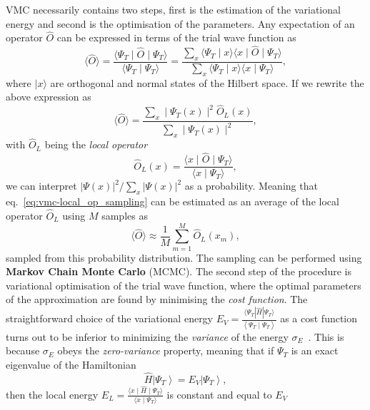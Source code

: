 VMC necessarily contains two steps, first is the estimation of the variational energy and second is the optimisation of the parameters. Any expectation of an operator $\hat{O}$ can be expressed in terms of the trial wave function as
\begin{equation}
	\langle\hat{O}\rangle=\frac{\langle\Psi_{T}\mid\hat{O}\mid \Psi_{T}\rangle}{\langle\Psi_{T} \mid \Psi_{T}\rangle}=\frac{\sum_{x}\langle\Psi_{T} \mid x\rangle\langle x\mid\hat{O}\mid \Psi_{T}\rangle}{\sum_{x}\langle\Psi_{T} \mid x\rangle\langle x \mid \Psi_{T}\rangle},
\end{equation}
where $\mid x \rangle$ are orthogonal and normal states of the Hilbert space. If we rewrite the above expression as 
\begin{equation}
	\label{eq:vmc-local_op_sampling}
	\langle \hat{O} \rangle = \frac{\sum_{x}\mid\Psi_{T}(x)\mid^{2} \hat{O}_{L}(x)}{\sum_{x}\mid\Psi_{T}(x)\mid^{2}},
\end{equation}
with $\hat{O}_L$ being the \emph{local operator}
\begin{equation}
	\hat{O}_{L}(x)=\frac{\langle x\mid\hat{O}\mid \Psi_{T}\rangle}{\langle x \mid \Psi_{T}\rangle}, 
\end{equation}
	we can interpret $|\Psi(x)|^{2}/\sum_{x}|\Psi(x)|^{2}$ as a probability. Meaning that eq.~\eqref{eq:vmc-local_op_sampling} can be estimated as an average of the local operator $\hat{O}_L$ using $M$ samples as
\begin{equation}
	\langle\hat{O}\rangle \approx \frac{1}{M} \sum_{m=1}^{M} \hat{O}_{L}\left(x_{m}\right),
\end{equation}
sampled from this probability distribution. The sampling can be performed using \textbf{Markov Chain Monte Carlo} (MCMC). The second step of the procedure is variational optimisation of the trial wave function, where the optimal parameters of the approximation are found by minimising the \emph{cost function}. The straightforward choice of the variational energy $E_V = \frac{\langle\Psi_{T}|\hat{H}| \Psi_{T}\rangle}{\left\langle\Psi_{T} \mid \Psi_{T}\right\rangle}$ as a cost function turns out to be inferior to minimizing the \emph{variance} of the energy $\sigma_E$~\cite{foulkes2001quantum}. This is because $\sigma_E$ obeys the \emph{zero-variance} property, meaning that if $\Psi_{T}$ is an exact eigenvalue of the Hamiltonian
\begin{equation}
	\hat{H}\left|\Psi_{T}\right\rangle=E_{V}\left|\Psi_{T}\right\rangle,
\end{equation}
then the local energy $E_L=\frac{\langle x\mid\hat{H}\mid \Psi_{T}\rangle}{\langle x \mid \Psi_{T}\rangle}$ is constant and equal to $E_V$
